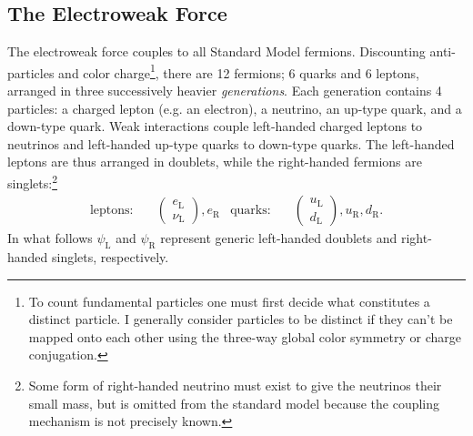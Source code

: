 \subsection{The Electroweak Force}

The electroweak force couples to all Standard Model fermions. Discounting anti-particles and color charge\footnote{To count fundamental particles one must first decide what constitutes a distinct particle. I generally consider particles to be distinct if they can't be mapped onto each other using the three-way global color symmetry or charge conjugation.}, there are 12 fermions; 6 quarks and 6 leptons, arranged in three successively heavier \emph{generations}. Each generation contains 4 particles: a charged lepton (e.g. an electron), a neutrino, an up-type quark, and a down-type quark. Weak interactions couple left-handed charged leptons to neutrinos and left-handed up-type quarks to down-type quarks. The left-handed leptons are thus arranged in doublets, while the right-handed fermions are singlets:\footnote{Some form of right-handed neutrino must exist to give the neutrinos their small mass, but is omitted from the standard model because the coupling mechanism is not precisely known.}
\begin{align}
  \text{leptons:}\quad &
  \left(\begin{matrix} e_{\mathrm{L}} \\ \nu_{\mathrm{L}} \end{matrix} \right),
  e_{\mathrm{R}}
  &
  \text{quarks:}\quad &
  \left(\begin{matrix} u_{\mathrm{L}} \\ d_{\mathrm{L}} \end{matrix} \right),
  u_{\mathrm{R}}, d_{\mathrm{R}}.
\end{align}
In what follows $\psi_{\mathrm{L}}$ and $\psi_{\mathrm{R}}$ represent generic left-handed doublets and right-handed singlets, respectively.

